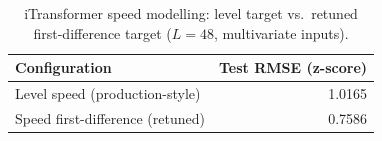 \begin{table}[H]
  \centering
  \caption{iTransformer speed modelling: level target vs.\ retuned first-difference target ($L=48$, multivariate inputs).}
  \label{tab:itransformer-retrain}
  \begin{tabular}{@{}lr@{}}
    \toprule
    Configuration & Test RMSE (z-score) \\
    \midrule
    Level speed (production-style) & 1.0165 \\
    Speed first-difference (retuned) & 0.7586 \\
    \bottomrule
  \end{tabular}
\end{table}
